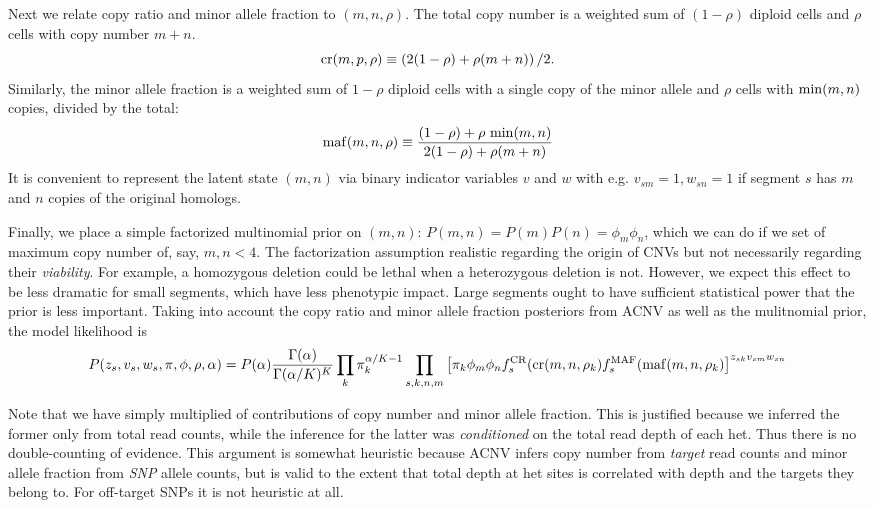 \documentclass[nofootinbib,amssymb,amsmath]{revtex4}
\begin{document}
Next we relate copy ratio and minor allele fraction to $(m, n, \rho)$.  The total copy number is a weighted sum of $(1-\rho)$ diploid cells and $\rho$ cells with copy number $m+n$.  
%
\begin{equation}
{\rm cr}(m, p, \rho) \equiv \left( 2(1-\rho) + \rho(m + n) \right)/2.
\end{equation}
%
Similarly, the minor allele fraction is a weighted sum of $1 - \rho$ diploid cells with a single copy of the minor allele and $\rho$ cells with ${\rm min}(m,n)$ copies, divided by the total:
%
\begin{equation}
{\rm maf}(m, n, \rho) \equiv \frac{(1- \rho) + \rho ~ {\rm min}(m,n)}{2(1-\rho) + \rho (m + n)}
\end{equation}
%
It is convenient to represent the latent state $(m,n)$ via binary indicator variables $v$ and $w$ with e.g. $v_{sm} = 1, w_{sn} = 1$ if segment $s$ has $m$ and $n$ copies of the original homologs.

Finally, we place a simple factorized multinomial prior on $(m,n)$: $P(m,n) = P(m)P(n) = \phi_m \phi_n$, which we can do if we set of maximum copy number of, say, $m, n < 4$.  The factorization assumption realistic regarding the origin of CNVs but not necessarily regarding their \textit{viability}.  For example, a homozygous deletion could be lethal when a heterozygous deletion is not.  However, we expect this effect to be less dramatic for small segments, which have less phenotypic impact.  Large segments ought to have sufficient statistical power that the prior is less important.  Taking into account the copy ratio and minor allele fraction posteriors from ACNV as well as the mulitnomial prior, the model likelihood is
%
\begin{equation}
P(z_s, v_s, w_s, \pi, \phi, \rho, \alpha) = P(\alpha) \frac{ \Gamma(\alpha) }{\Gamma(\alpha/K)^K} \prod_k \pi_k^{\alpha/K - 1} \prod_{s, k,n,m} \left[ \pi_k \phi_m \phi_n f_s^{\rm CR}({\rm cr}(m,n,\rho_k) f_s^{\rm MAF}({\rm maf}(m,n,\rho_k) \right]^{z_{sk} v_{sm} w_{sn}}
\end{equation}
%

Note that we have simply multiplied of contributions of copy number and minor allele fraction.  This is justified because we inferred the former only from total read counts, while the inference for the latter was \textit{conditioned} on the total read depth of each het.  Thus there is no double-counting of evidence.  This argument is somewhat heuristic because ACNV infers copy number from \textit{target} read counts and minor allele fraction from \textit{SNP} allele counts, but is valid to the extent that total depth at het sites is correlated with depth and the targets they belong to.  For off-target SNPs it is not heuristic at all.
\end{document}
